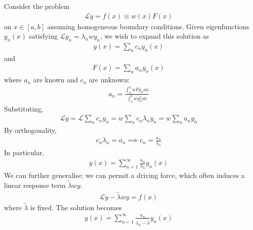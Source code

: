 \noindent Consider the problem
\begin{align*}
    \mathcal L y = f(x) \equiv w(x) F(x)
\end{align*}
on $x \in [a,b]$ assuming homogeneous boundary conditions.
Given eigenfunctions $y_n(x)$ satisfying $\mathcal L y_n = \lambda_n w y_n$, we wish to expand this solution as
\begin{align*}
    y(x) = \sum_n c_n y_n(x)
\end{align*}
and
\begin{align*}
    F(x) = \sum_n a_n y_n(x)
\end{align*}
where $a_n$ are known and $c_n$ are unknown:
\begin{align*}
    a_n = \frac{\int_a^b w F y_n \dd{x}}{\int_a^b w y_n^2 \dd{x}}
\end{align*}
Substituting,
\begin{align*}
    \mathcal L y = \mathcal L \sum_n c_n y_n = w \sum_n c_n \lambda_n y_n = w \sum_n a_n y_n
\end{align*}
By orthogonality,
\begin{align*}
    c_n \lambda_n = a_n \implies c_n = \frac{a_n}{\lambda_n}
\end{align*}
In particular,
\begin{align*}
    y(x) = \sum_{n=1}^\infty \frac{a_n}{\lambda_n}y_n(x)
\end{align*}
We can further generalise; we can permit a driving force, which often induces a linear response term $\widetilde\lambda w y$.
\begin{align*}
    \mathcal L y - \widetilde \lambda w y = f(x)
\end{align*}
where $\widetilde \lambda$ is fixed.
The solution becomes
\begin{align*}
    y(x) = \sum_{n=1}^\infty \frac{a_n}{\lambda_n - \widetilde \lambda} y_n(x)
\end{align*}

